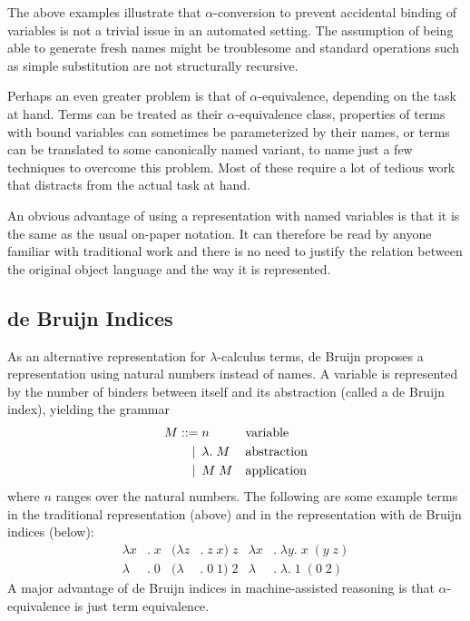 \documentclass[a4paper,11pt]{article}
\begin{document}
The above examples illustrate that $\alpha$-conversion to prevent
accidental binding of variables is not a trivial issue in an automated
setting.
The assumption of being able to generate fresh names might be troublesome
and standard operations such as simple substitution are not structurally
recursive.

Perhaps an even greater problem is that of $\alpha$-equivalence, depending
on the task at hand.
Terms can be treated as their $\alpha$-equivalence class, properties of
terms with bound variables can sometimes be parameterized by their names,
or terms can be translated to some canonically named variant, to name just
a few techniques to overcome this problem.
Most of these require a lot of tedious work that distracts from the actual
task at hand.

An obvious advantage of using a representation with named variables is
that it is the same as the usual on-paper notation.
It can therefore be read by anyone familiar with traditional work and there
is no need to justify the relation between the original object language and
the way it is represented.


\subsection{de Bruijn Indices}

As an alternative representation for $\lambda$-calculus terms, de Bruijn
\cite{deBruijn-72} proposes a representation using natural numbers instead
of names.
A variable is represented by the number of binders between itself and its
abstraction (called a de Bruijn index), yielding the grammar
\begin{align*}
  M ::=             &\; n
  && \text{variable} \\
  \llap{\textbar\:} &\; \lambda . \; M
  && \text{abstraction} \\
  \llap{\textbar\:} &\; M \; M
  && \text{application}
\end{align*}
where $n$ ranges over the natural numbers.
The following are some example terms in the traditional representation
(above) and in the representation with de Bruijn indices (below):
\begin{align*}
  \lambda x&. \; x & (\lambda z&. \; z \; x) \; z & \lambda x&. \; \lambda y. \; x \; (y \; z)\\
  \lambda &. \; 0  & (\lambda &. \; 0 \; 1) \; 2  & \lambda &. \; \lambda . \; 1 \; (0 \; 2)
\end{align*}
A major advantage of de Bruijn indices in machine-assisted reasoning
is that $\alpha$-equivalence is just term equivalence.
\end{document}
